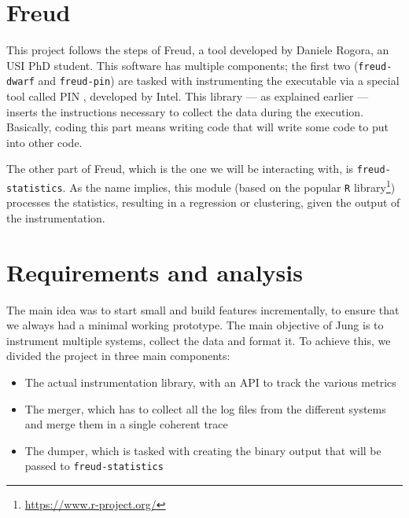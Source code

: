     \section{Freud}\label{sec:freud}


        This project follows the steps of Freud, a tool developed by Daniele Rogora, an USI PhD student.
        This software has multiple components; the first two (\texttt{freud-dwarf} and \texttt{freud-pin})
        are tasked with instrumenting the executable 
        via a special tool called PIN \cite{PIN}, developed by Intel. This library --- as explained earlier --- 
        inserts the instructions necessary to collect the data during the execution. Basically, coding this
        part means writing code that will write some code to put into other code.

        The other part of Freud, which is the one we will be interacting with, is \texttt{freud-statistics}.
        As the name implies, this module (based on the popular \texttt{R} library\footnote{\url{https://www.r-project.org/}})
        processes the statistics, resulting in a regression or clustering, given the output of the instrumentation.


    \section{Requirements and analysis}\label{sec:requirements}


        The main idea was to start small and build features incrementally, to ensure that we always
        had a minimal working prototype.  The main objective of
        Jung is to instrument multiple systems, collect the data and format it.
        To achieve this, we divided the project in three main components:

        \begin{itemize}
            \item The actual instrumentation library, with an API to track the various metrics
            \item The merger, which has to collect all the log files from the different systems
             and merge them in a single coherent trace
            \item The dumper, which is tasked with creating the binary output that will be passed
             to \texttt{freud-statistics}
        \end{itemize}

